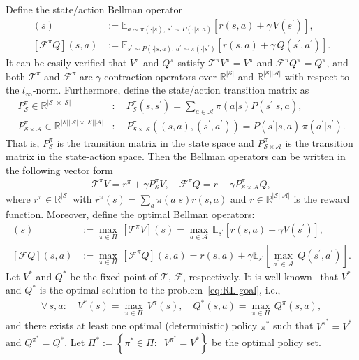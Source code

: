 \documentclass[10pt]{article}
\newcommand{\calA}{\mathcal{A}}
\newcommand{\calS}{\mathcal{S}}
\newcommand{\calT}{\mathcal{T}}
\newcommand{\calF}{\mathcal{F}}
\newcommand{\E}{\mathbb{E}}
\newcommand{\ls}{\left}
\newcommand{\rs}{\right}
\theoremstyle{plain}
\theoremstyle{definition}
\begin{document}
Define the state/action Bellman operator 
\begin{align*}
    [\calT^\pi V](s) &:= \E_{a\sim\pi(\cdot|s),\, s^\prime\sim P(\cdot|s,a)}[r(s,a) + \gamma \, V(s^\prime)], \\
    [\calF^\pi Q](s,a) &:= \E_{s^\prime\sim P(\cdot|s,a), \, a^\prime\sim\pi(\cdot|s^\prime)} [r(s,a) + \gamma \, Q(s^\prime, a^\prime)].
\end{align*}
It can be easily verified that $V^\pi$ and $Q^\pi$ satisfy $\calT^\pi V^\pi = V^\pi$ and $\calF^\pi Q^\pi = Q^\pi$, and both $\calT^\pi$ and $\calF^\pi$ are $\gamma$-contraction operators over $\mathbb{R}^{|\calS|}$ and $\mathbb{R}^{|\calS||\calA|}$ with respect to the $l_\infty$-norm. Furthermore, define the state/action transition matrix as
\begin{align*}
    P_{\scriptscriptstyle\calS}^\pi \in \mathbb{R}^{|\calS| \times |\calS|} &: \quad P^\pi_{\scriptscriptstyle\calS}(s, s^\prime) = \sum_{a\in\calA} \pi(a|s) P(s^\prime | s,a), \\
    P^{\pi}_{\scriptscriptstyle \calS\times\calA} \in \mathbb{R}^{|\calS||\calA| \times |\calS||\calA|}&: \quad P^{\pi}_{\scriptscriptstyle \calS\times\calA}((s,a), (s^\prime, a^\prime)) = P(s^\prime | s,a) \, \pi(a^\prime | s^\prime).
\end{align*}
That is, $P^{\pi}_{\scriptscriptstyle\calS}$ is the transition matrix in the state space and $P^{\pi}_{\scriptscriptstyle\calS\times\calA}$ is the transition matrix in the state-action space. Then the Bellman operators can be written in the following vector form
\begin{align*}
    \calT^\pi V = r^\pi + \gamma P^\pi_{\scriptscriptstyle\calS} V, \quad \calF^\pi Q = r + \gamma P^\pi_{\scriptscriptstyle\calS\times\calA} Q,
\end{align*}
where $r^\pi \in \mathbb{R}^{|\calS|}$ with $r^\pi(s) = \sum_a \pi(a|s) r(s,a)$ and $r \in \mathbb{R}^{|\calS||\calA|}$ is the reward function. Moreover, define the optimal Bellman operators:
\begin{align*}
    [\calT V](s) &:= \max_{\pi\in\Pi} \, [\calT^\pi V](s) = \max_{a\in\calA} \, \E_{s^\prime}[r(s,a) + \gamma V(s^\prime)], \\
    [\calF Q](s,a) &:= \max_{\pi\in\Pi} \, [\calF^\pi Q](s,a) = r(s,a) + \gamma\E_{s^\prime} \ls[\max_{a^\prime\in\calA} \,Q(s^\prime, a^\prime) \rs].
\end{align*}
Let $V^*$ and $Q^*$ be the fixed point of $\calT$, $\calF$, respectively. It is well-known~\citep{suttonRL} that $V^*$ and $Q^*$ is the optimal solution to the problem~\eqref{eq:RL-goal}, i.e., 
\begin{align*}
    \forall\, s, a: \quad V^*(s) = \max_{\pi\in\Pi} \, V^\pi(s), \quad Q^*(s,a) = \max_{\pi\in\Pi} \, Q^\pi(s,a),
\end{align*}
and there exists at least one optimal (deterministic) policy $\pi^*$ such that $V^{\pi^*}=V^*$ and $Q^{\pi^*}=Q^*$. Let $\Pi^* := \ls\{ \pi^* \in \Pi: \;\; V^{\pi^*}=V^* \rs\}$ be the optimal policy set. %
\end{document}
